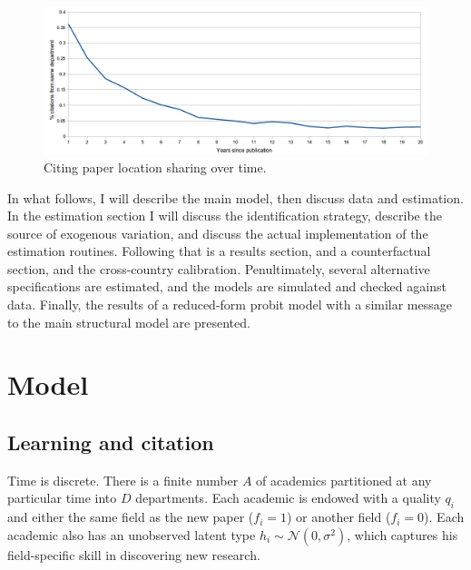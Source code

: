 \begin{figure}[!ht]
    \centering
    \includegraphics[scale=0.35]{pics/raw_diffusion.png}
    \caption{Citing paper location sharing over time.}
    \label{fig:rawdiffusion}
\end{figure}

In what follows, I will describe the main model, then discuss data and
estimation. In the estimation section I will discuss the identification
strategy, describe the source of exogenous variation, and discuss the
actual implementation of the estimation routines. Following that is a
results section, and a counterfactual section, and the cross-country calibration.
Penultimately, several alternative
specifications are estimated, and the models are simulated and checked
against data.  Finally, the results of a reduced-form probit model with a similar 
message to the main structural model are presented.

\section{Model}
\label{sec:model}

\subsection{Learning and citation}
\label{sec:learncit}

Time is discrete. There is a finite number $A$ of academics partitioned
at any particular time into $D$ departments. Each academic is endowed with a quality
$q_i$ and either the same field as the new paper ($f_i = 1$) or another
field ($f_i = 0$). Each academic also has an unobserved latent type
$h_i \sim \mathcal{N}(0,\sigma^2)$, which captures his field-specific
skill in discovering new research.

